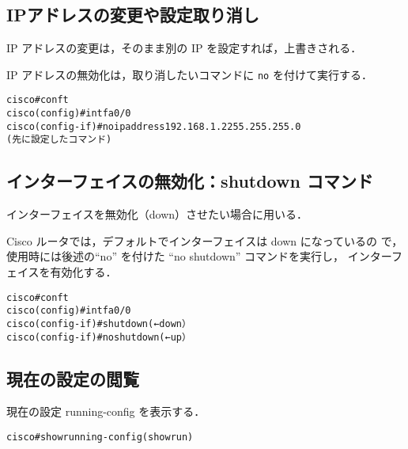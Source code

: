 \subsection*{IPアドレスの変更や設定取り消し}
IP アドレスの変更は，そのまま別の IP を設定すれば，上書きされる．

IP アドレスの無効化は，取り消したいコマンドに \texttt{no} を付けて実行する．

\begin{center}
\begin{screen}
\begin{alltt}
cisco#conf t
cisco(config)#int fa0/0
cisco(config-if)#no ip address 192.168.1.2 255.255.255.0
                    (先に設定したコマンド)
\end{alltt}
\end{screen}
\end{center}

\subsection*{インターフェイスの無効化：shutdown コマンド}
インターフェイスを無効化（down）させたい場合に用いる．

Cisco ルータでは，デフォルトでインターフェイスは down になっているの
で，使用時には後述の``no'' を付けた ``no shutdown'' コマンドを実行し，
インターフェイスを有効化する．

\begin{center}
\begin{screen}
\begin{alltt}
cisco#conf t
cisco(config)#int fa0/0
cisco(config-if)#shutdown         ( ← down）
cisco(config-if)#no shutdown      ( ← up）
\end{alltt}
\end{screen}
\end{center}

\subsection*{現在の設定の閲覧}
現在の設定 running-config を表示する．

\begin{center}
\begin{screen}
\begin{alltt}
cisco#show running-config   (show run)
\end{alltt}
\end{screen}
\end{center}

